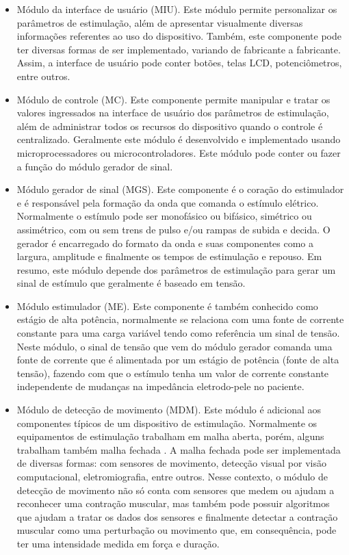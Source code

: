 \begin{itemize}
    \item Módulo da interface de usuário (\acrshort{MIU}). Este módulo permite personalizar os parâmetros de estimulação, além de apresentar visualmente diversas informações referentes ao uso do dispositivo. Também, este componente pode ter diversas formas de ser implementado, variando de fabricante a fabricante. Assim, a interface de usuário pode conter botões, telas \acrshort{LCD}, potenciômetros, entre outros.
    
    \item Módulo de controle (\acrshort{MC}). Este componente permite manipular e tratar os valores ingressados na interface de usuário dos parâmetros de estimulação, além de administrar todos os recursos do dispositivo quando o controle é centralizado. Geralmente este módulo é desenvolvido e implementado usando microprocessadores ou microcontroladores. Este módulo pode conter ou fazer a função do módulo gerador de sinal.
    
    \item Módulo gerador de sinal (\acrshort{MGS}). Este componente é o coração do estimulador e é responsável pela formação da onda que comanda o estímulo elétrico. Normalmente o estímulo pode ser monofásico ou bifásico, simétrico ou assimétrico, com ou sem trens de pulso e/ou rampas de subida e decida. O gerador é encarregado do formato da onda e suas componentes como a largura, amplitude e finalmente os tempos de estimulação e repouso. Em resumo, este módulo depende dos parâmetros de estimulação para gerar um sinal de estímulo que geralmente é baseado em tensão.
    
    \item Módulo estimulador (\acrshort{ME}). Este componente é também conhecido como estágio de alta potência, normalmente se relaciona com uma fonte de corrente constante para uma carga variável tendo como referência um sinal de tensão. Neste módulo, o sinal de tensão que vem do módulo gerador comanda uma fonte de corrente que é alimentada por um estágio de potência (fonte de alta tensão), fazendo com que o estímulo tenha um valor de corrente constante independente de mudanças na impedância eletrodo-pele no paciente. 
    
    \item Módulo de detecção de movimento (\acrshort{MDM}). Este módulo é adicional aos componentes típicos de um dispositivo de estimulação. Normalmente os equipamentos de estimulação trabalham em malha aberta, porém, alguns trabalham também malha fechada \cite{Sanches2013SistemaParaplegicos}. A malha fechada pode ser implementada de diversas formas: com sensores de movimento, detecção visual por visão computacional, eletromiografia, entre outros. Nesse contexto, o módulo de detecção de movimento não só conta com sensores que medem ou ajudam a reconhecer uma contração muscular, mas também pode possuir algoritmos que ajudam a tratar os dados dos sensores e finalmente detectar a contração muscular como uma perturbação ou movimento que, em consequência, pode ter uma intensidade medida em força e duração.

\end{itemize}


